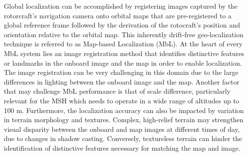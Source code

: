 Global localization can be accomplished by registering images captured by the rotorcraft's navigation camera onto orbital maps that are pre-registered to a global reference frame
followed by the derivation of the rotocraft's position and orientation relative to the orbital map.
This inherently drift-free geo-localization technique is referred to as Map-based Localization (MbL). At the heart of every MbL system lies an image registration method that identifies distinctive features or landmarks in the onboard image and the map in order to enable localization. 
The image registration can be very challenging in this domain due to the large differences in lighting between the onboard image and the map. Another factor that may challenge MbL performance is that of scale difference, particularly relevant for the MSH which needs to operate in a wide range of altitudes up to 100 m. 
Furthermore, the localization accuracy can also be impacted by variation in terrain morphology and textures. Complex, high-relief terrain may strengthen visual disparity between the onboard and map images at different times of day, due to changes in shadow casting. Conversely, textureless terrain can hinder the identification of distinctive features necessary for matching the map and image. 

